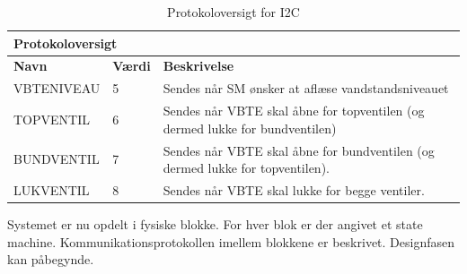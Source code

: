 \begin{table}[htbp]
\centering
\begin{tabular}{|l|l|p{10cm}|}
\multicolumn{2}{l}{{\Large Protokoloversigt}} \\\hline
\textbf{Navn} &\textbf{Værdi} &\textbf{Beskrivelse}\\\hline
VBTENIVEAU&5&Sendes når SM ønsker at aflæse vandstandsniveauet\\\hline
TOPVENTIL&6&Sendes når VBTE skal åbne for topventilen (og dermed lukke for bundventilen)\\\hline
BUNDVENTIL&7&Sendes når VBTE skal åbne for bundventilen (og dermed lukke for topventilen).\\\hline
LUKVENTIL&8&Sendes når VBTE skal lukke for begge ventiler.\\\hline
\end{tabular}
\caption{Protokoloversigt for I2C}
\label{tabel:protokoloversigt}
\end{table}

Systemet er nu opdelt i fysiske blokke. For hver blok er der angivet et state machine. Kommunikationsprotokollen imellem blokkene er beskrivet. Designfasen kan påbegynde.




